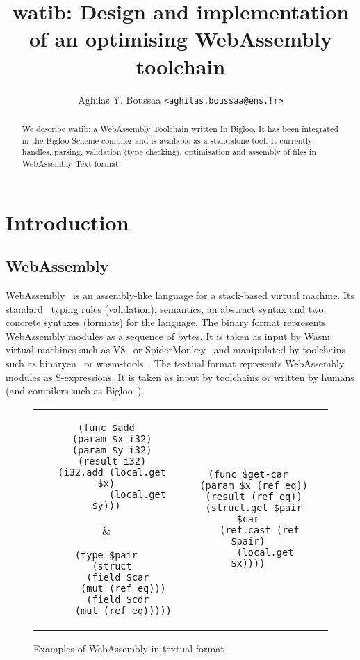 \documentclass[10pt]{article}
\author{Aghilas Y. Boussaa \texttt{<aghilas.boussaa@ens.fr>}}
\title{\textsf{watib}: Design and implementation of an optimising WebAssembly toolchain}
\begin{document}
\maketitle
\begin{abstract}
  We describe watib: a WebAssembly Toolchain written In Bigloo. It has
  been integrated in the Bigloo Scheme compiler and is available as a standalone
  tool. It currently handles, parsing, validation (type checking), optimisation
  and assembly of files in WebAssembly Text format.
\end{abstract}

\section{Introduction}
\subsection{WebAssembly}
WebAssembly~\cite{haas2017bringing} is an assembly-like language for a
stack-based virtual machine. Its standard~\cite{WebAssemblyCoreSpecification3}
typing rules (validation), semantics, an abstract syntax and two concrete
syntaxes (formats) for the language. The binary format represents WebAssembly
modules as a sequence of bytes. It is taken as input by Wasm virtual machines
such as V8~\cite{V8} or SpiderMonkey~\cite{SpiderMonkey} and manipulated by
toolchains such as binaryen~\cite{Binaryen} or wasm-tools~\cite{WasmTools}. The
textual format represents WebAssembly modules as S-expressions. It is taken as
input by toolchains or written by humans (and compilers such as
Bigloo~\cite{Bigloo}).
\begin{figure}[h]
\centering
\begin{tabular}{c c c}
\begin{minipage}{1.8in}
\begin{verbatim}
(func $add
  (param $x i32)
  (param $y i32)
  (result i32)
  (i32.add (local.get $x)
           (local.get $y)))
\end{verbatim}
\end{minipage}&
\begin{minipage}{1.6in}
\begin{verbatim}
(type $pair
  (struct
    (field $car
      (mut (ref eq)))
    (field $cdr
      (mut (ref eq)))))
\end{verbatim}
\end{minipage}
&\begin{minipage}{1.8in}
\begin{verbatim}
(func $get-car
  (param $x (ref eq))
  (result (ref eq))
  (struct.get $pair $car
    (ref.cast (ref $pair)
      (local.get $x))))
\end{verbatim}
\end{minipage}
\end{tabular}
\caption{Examples of WebAssembly in textual format}
\end{figure}
\end{document}
